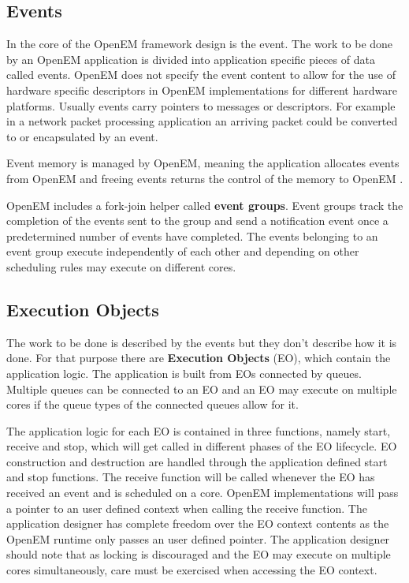 \subsection{Events}
\label{subsec:event}
In the core of the OpenEM framework design is the event. The work to be done by an OpenEM application is divided into application specific pieces of data called events. OpenEM does not specify the event content to allow for the use of hardware specific descriptors in OpenEM implementations for different hardware platforms. Usually events carry pointers to messages or descriptors. \cite{openemintro} For example in a network packet processing application an arriving packet could be converted to or encapsulated by an event.

Event memory is managed by OpenEM, meaning the application allocates events from OpenEM and freeing events returns the control of the memory to OpenEM \cite{openemintro}. 

OpenEM includes a fork-join helper called \textbf{event groups}. Event groups track the completion of the events sent to the group and send a notification event once a predetermined number of events have completed. The events belonging to an event group execute independently of each other and depending on other scheduling rules may execute on different cores. \cite{openemintro}

\subsection{Execution Objects}
\label{subsec:eos}
The work to be done is described by the events but they don't describe how it is done. For that purpose there are \textbf{Execution Objects} (EO), which contain the application logic. The application is built from EOs connected by queues. Multiple queues can be connected to an EO and an EO may execute on multiple cores if the queue types of the connected queues allow for it.  \cite{openemintro}

The application logic for each EO is contained in three functions, namely start, receive and stop, which will get called in different phases of the EO lifecycle. EO construction and destruction are handled through the application defined start and stop functions. The receive function will be called whenever the EO has received an event and is scheduled on a core. \cite{openemintro} OpenEM implementations will pass a pointer to an user defined context when calling the receive function. The application designer has complete freedom over the EO context contents as the OpenEM runtime only passes an user defined pointer. \cite{openemintro} The application designer should note that as locking is discouraged and the EO may execute on multiple cores simultaneously, care must be exercised when accessing the EO context.


